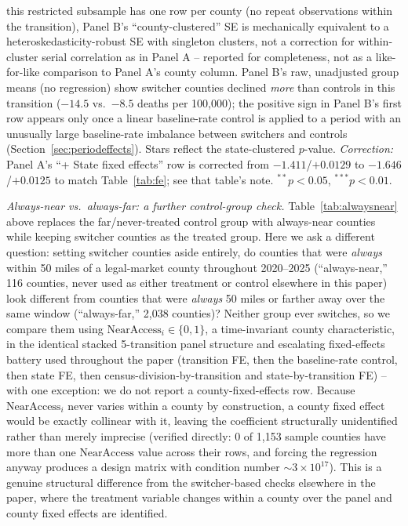 \documentclass[preprint,12pt,authoryear]{elsarticle}
\begin{document}
\begin{table}[htbp]
\begin{minipage}{0.95\textwidth}
this restricted subsample has one row per county (no repeat
observations within the transition), Panel B's ``county-clustered'' SE
is mechanically equivalent to a heteroskedasticity-robust SE with
singleton clusters, not a correction for within-cluster serial
correlation as in Panel A -- reported for completeness, not as a
like-for-like comparison to Panel A's county column. Panel B's raw,
unadjusted group means (no regression) show switcher counties declined
\emph{more} than controls in this transition ($-14.5$ vs.\ $-8.5$
deaths per 100,000); the positive sign in Panel B's first row appears
only once a linear baseline-rate control is applied to a period with
an unusually large baseline-rate imbalance between switchers and
controls (Section~\ref{sec:periodeffects}). Stars reflect the
state-clustered $p$-value. \emph{Correction:} Panel A's ``+ State fixed
effects'' row is corrected from $-1.411$/$+0.0129$ to $-1.646$/$+0.0125$
to match Table~\ref{tab:fe}; see that table's note. $^{**}p<0.05$,
$^{***}p<0.01$.
\end{minipage}
\end{table}

\noindent\emph{Always-near vs.\ always-far: a further control-group
check.} Table~\ref{tab:alwaysnear} above replaces the far/never-treated
control group with always-near counties while keeping switcher
counties as the treated group. Here we ask a different question:
setting switcher counties aside entirely, do counties that were
\emph{always} within 50 miles of a legal-market county throughout
2020--2025 (``always-near,'' 116 counties, never used as either
treatment or control elsewhere in this paper) look different from
counties that were \emph{always} 50 miles or farther away over the
same window (``always-far,'' 2,038 counties)? Neither group ever
switches, so we compare them using $\text{NearAccess}_i \in \{0,1\}$,
a time-invariant county characteristic, in the identical stacked
5-transition panel structure and escalating fixed-effects battery used
throughout the paper (transition FE, then the baseline-rate control,
then state FE, then census-division-by-transition and
state-by-transition FE) -- with one exception: we do not report a
county-fixed-effects row. Because $\text{NearAccess}_i$ never varies
within a county by construction, a county fixed effect would be
exactly collinear with it, leaving the coefficient structurally
unidentified rather than merely imprecise (verified directly: 0 of
1,153 sample counties have more than one $\text{NearAccess}$ value
across their rows, and forcing the regression anyway produces a design
matrix with condition number $\sim 3\times10^{17}$). This is a genuine
structural difference from the switcher-based checks elsewhere in the
paper, where the treatment variable changes within a county over the
panel and county fixed effects are identified.
\end{document}
